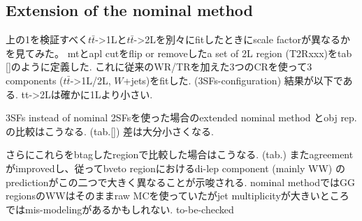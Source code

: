 \subsection{Extension of the nominal method} \label{sec::ObjReplace::result::extension}
上の1を検証すべく$t\bar{t}$->1Lと$t\bar{t}$->2Lを別々にfitしたときにscale factorが異なるかを見てみた。
mtとapl cutをflip or removeしたa set of 2L region (T2Rxxx)をtab \ref{}のように定義した.
これに従来のWR/TRを加えた3つのCRを使って3 components ($t\bar{t}$->1L/2L, $W$+jets)をfitした. (3SFs-configuration)
結果が以下である. tt->2Lは確かに1Lより小さい. 

3SFs instead of nominal 2SFsを使った場合のextended nominal method とobj rep.の比較はこうなる. (tab.\ref{})
差は大分小さくなる.

さらにこれらをbtagしたregionで比較した場合はこうなる. (tab.)
またagreementがimprovedし、従ってbveto regionにおけるdi-lep component (mainly WW) のpredictionがこの二つで大きく異なることが示唆される. nominal methodではGG regionsのWWはそのままraw MCを使っていたがjet multiplicityが大きいところではmis-modelingがあるかもしれない. to-be-checked




\fi
